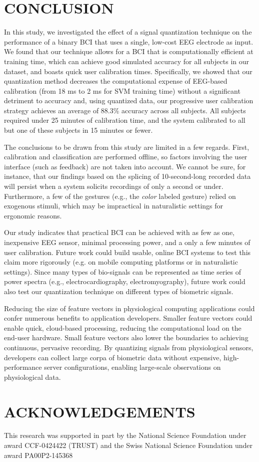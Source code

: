\section{\uppercase{Conclusion}}
\label{sec:conclusion}

\noindent In this study, we investigated the effect of a signal quantization technique on the performance of a binary BCI that uses a single, low-cost EEG electrode as input. We found that our technique allows for a BCI that is computationally efficient at training time, which can achieve good simulated accuracy for all subjects in our dataset, and boasts quick user calibration times. Specifically, we showed that our quantization method decreases the computational expense of EEG-based calibration (from 18 ms to 2 ms for SVM training time) without a significant detriment to accuracy and, using quantized data, our progressive user calibration strategy achieves an average of 88.3\% accuracy across all subjects. All subjects required under 25 minutes of calibration time, and the system calibrated to all but one of these subjects in 15 minutes or fewer.

The conclusions to be drawn from this study are limited in a few regards. First, calibration and classification are performed offline, so factors involving the user interface (such as feedback) are not taken into account. We cannot be sure, for instance, that our findings based on the splicing of 10-second-long recorded data will persist when a system solicits recordings of only a second or under. Furthermore, a few of the gestures (e.g., the {\it color} labeled gesture) relied on exogenous stimuli, which may be impractical in naturalistic settings for ergonomic reasons. 

Our study indicates that practical BCI can be achieved with as few as one, inexpensive EEG sensor, minimal processing power, and a only a few minutes of user calibration. Future work could build usable, online BCI systems to test this claim more rigorously (e.g. on mobile computing platforms or in naturalistic settings). Since many types of bio-signals can be represented as time series of power spectra (e.g., electrocardiography, electromyography), future work could also test our quantization technique on different types of biometric signals.

Reducing the size of feature vectors in physiological computing applications could confer numerous benefits to application developers. Smaller feature vectors could enable quick, cloud-based processing, reducing the computational load on the end-user hardware. Small feature vectors also lower the boundaries to achieving continuous, pervasive recording. By quantizing signals from physiological sensors, developers can collect large corpa of biometric data without expensive, high-performance server configurations, enabling large-scale observations on physiological data.


\section*{\uppercase{Acknowledgements}}
This research was supported in part by the National Science Foundation under award CCF-0424422 (TRUST) and the Swiss National Science Foundation under award PA00P2-145368

